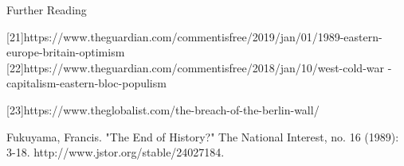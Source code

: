Further Reading

   [21]https://www.theguardian.com/commentisfree/2019/jan/01/1989-eastern-
   europe-britain-optimism
   [22]https://www.theguardian.com/commentisfree/2018/jan/10/west-cold-war
   -capitalism-eastern-bloc-populism

   [23]https://www.theglobalist.com/the-breach-of-the-berlin-wall/

   Fukuyama, Francis. "The End of History?" The National Interest, no. 16
   (1989): 3-18. http://www.jstor.org/stable/24027184.

